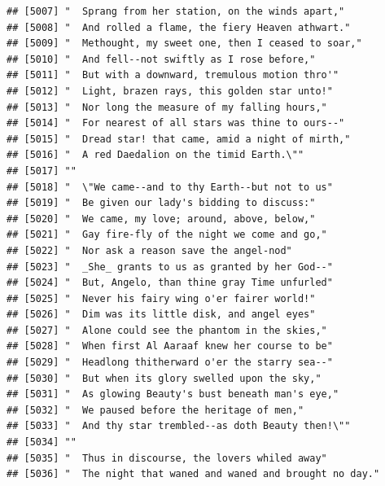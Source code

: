 \documentclass{article}\usepackage[]{graphicx}\usepackage[]{color}
\makeatletter
\newenvironment{kframe}{%
 \def\at@end@of@kframe{}%
 \ifinner\ifhmode%
  \def\at@end@of@kframe{\end{minipage}}%
  \begin{minipage}{\columnwidth}%
 \fi\fi%
 \def\FrameCommand##1{\hskip\@totalleftmargin \hskip-\fboxsep
 \colorbox{shadecolor}{##1}\hskip-\fboxsep
     \hskip-\linewidth \hskip-\@totalleftmargin \hskip\columnwidth}%
 \MakeFramed {\advance\hsize-\width
   \@totalleftmargin\z@ \linewidth\hsize
   \@setminipage}}%
 {\par\unskip\endMakeFramed%
 \at@end@of@kframe}
\newenvironment{knitrout}{}{} %
\makeatother
\begin{document}
\begin{knitrout}
\begin{kframe}
\begin{verbatim}
## [5007] "  Sprang from her station, on the winds apart,"                              
## [5008] "  And rolled a flame, the fiery Heaven athwart."                             
## [5009] "  Methought, my sweet one, then I ceased to soar,"                           
## [5010] "  And fell--not swiftly as I rose before,"                                   
## [5011] "  But with a downward, tremulous motion thro'"                               
## [5012] "  Light, brazen rays, this golden star unto!"                                
## [5013] "  Nor long the measure of my falling hours,"                                 
## [5014] "  For nearest of all stars was thine to ours--"                              
## [5015] "  Dread star! that came, amid a night of mirth,"                             
## [5016] "  A red Daedalion on the timid Earth.\""                                     
## [5017] ""                                                                            
## [5018] "  \"We came--and to thy Earth--but not to us"                                
## [5019] "  Be given our lady's bidding to discuss:"                                   
## [5020] "  We came, my love; around, above, below,"                                   
## [5021] "  Gay fire-fly of the night we come and go,"                                 
## [5022] "  Nor ask a reason save the angel-nod"                                       
## [5023] "  _She_ grants to us as granted by her God--"                                
## [5024] "  But, Angelo, than thine gray Time unfurled"                                
## [5025] "  Never his fairy wing o'er fairer world!"                                   
## [5026] "  Dim was its little disk, and angel eyes"                                   
## [5027] "  Alone could see the phantom in the skies,"                                 
## [5028] "  When first Al Aaraaf knew her course to be"                                
## [5029] "  Headlong thitherward o'er the starry sea--"                                
## [5030] "  But when its glory swelled upon the sky,"                                  
## [5031] "  As glowing Beauty's bust beneath man's eye,"                               
## [5032] "  We paused before the heritage of men,"                                     
## [5033] "  And thy star trembled--as doth Beauty then!\""                             
## [5034] ""                                                                            
## [5035] "  Thus in discourse, the lovers whiled away"                                 
## [5036] "  The night that waned and waned and brought no day."                        

\end{verbatim}
\end{kframe}
\end{knitrout}
\end{document}
